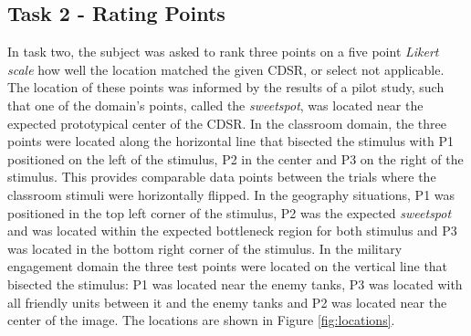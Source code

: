 \documentclass[11pt,letterpaper]{article}
\begin{document}
\subsection{Task 2 - Rating Points} 
In task two, the subject was asked to rank three points on a five point \textit{Likert scale} how well the location matched the given CDSR, or select not applicable.  The location of these points was informed by the results of a pilot study, such that one of the domain's points, called the \textit{sweetspot}, was located near the expected prototypical center of the CDSR. In the classroom domain, the three points were located along the horizontal line that bisected the stimulus with P1 positioned on the left of the stimulus, P2 in the center and P3 on the right of the stimulus.  This provides comparable data points between the trials where the classroom stimuli were horizontally flipped.  In the geography situations, P1 was positioned in the top left corner of the stimulus, P2 was the expected \textit{sweetspot} and was located within the expected bottleneck region for both stimulus and P3 was located in the bottom right corner of the stimulus.  In the military engagement domain the three test points were located on the vertical line that bisected the stimulus: P1 was located near the enemy tanks, P3 was located with all friendly units between it and the enemy tanks and P2 was located near the center of the image.  The locations are shown in Figure \ref{fig:locations}.
\end{document}
